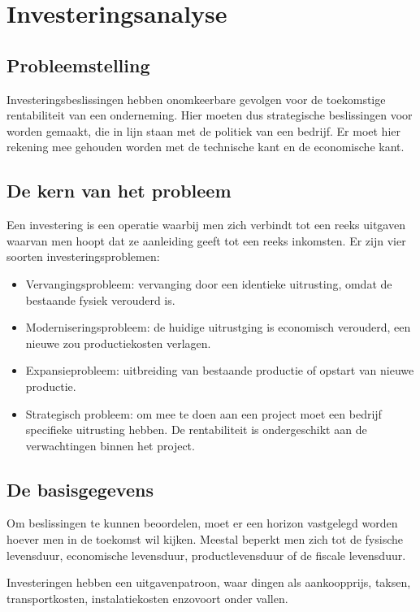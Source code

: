 \documentclass[../../samenvatting.tex]{subfiles}
\begin{document}
\section{Investeringsanalyse}

\subsection{Probleemstelling}
Investeringsbeslissingen hebben onomkeerbare gevolgen voor de toekomstige rentabiliteit van een onderneming. Hier moeten dus strategische beslissingen voor worden gemaakt, die in lijn staan met de politiek van een bedrijf. Er moet hier rekening mee gehouden worden met de technische kant en de economische kant.

\subsection{De kern van het probleem}
Een investering is een operatie waarbij men zich verbindt tot een reeks uitgaven waarvan men hoopt dat ze aanleiding geeft tot een reeks inkomsten. Er zijn vier soorten investeringsproblemen:
\begin{itemize}
    \item Vervangingsprobleem: vervanging door een identieke uitrusting, omdat de bestaande fysiek verouderd is.
    \item Moderniseringsprobleem: de huidige uitrustging is economisch verouderd, een nieuwe zou productiekosten verlagen.
    \item Expansieprobleem: uitbreiding van bestaande productie of opstart van nieuwe productie.
    \item Strategisch probleem: om mee te doen aan een project moet een bedrijf specifieke uitrusting hebben. De rentabiliteit is ondergeschikt aan de verwachtingen binnen het project.
\end{itemize}

\subsection{De basisgegevens}

Om beslissingen te kunnen beoordelen, moet er een horizon vastgelegd worden hoever men in de toekomst wil kijken. Meestal beperkt men zich tot de fysische levensduur, economische levensduur, productlevensduur of de fiscale levensduur.

Investeringen hebben een uitgavenpatroon, waar dingen als aankoopprijs, taksen, transportkosten, instalatiekosten enzovoort onder vallen.
\end{document}
